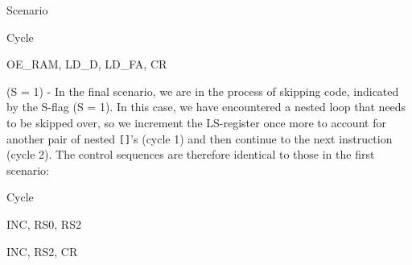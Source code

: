 \begin{labeledenum}{Scenario}
    \begin{labeledenum}{Cycle}
    \item OE\_RAM, LD\_D, LD\_FA, CR
    \end{labeledenum}
    
  \item (S = 1) - In the final scenario, we are in the process of skipping code, indicated by the S-flag (S = 1). In this case, we have encountered a nested loop that needs to be skipped over, so we increment the LS-register once more to account for another pair of nested \texttt{[]}'s (cycle 1) and then continue to the next instruction (cycle 2). The control sequences are therefore identical to those in the first scenario:
    
    \begin{labeledenum}{Cycle}
    \item INC, RS0, RS2
    \item INC, RS2, CR
    \end{labeledenum}

\end{labeledenum}


